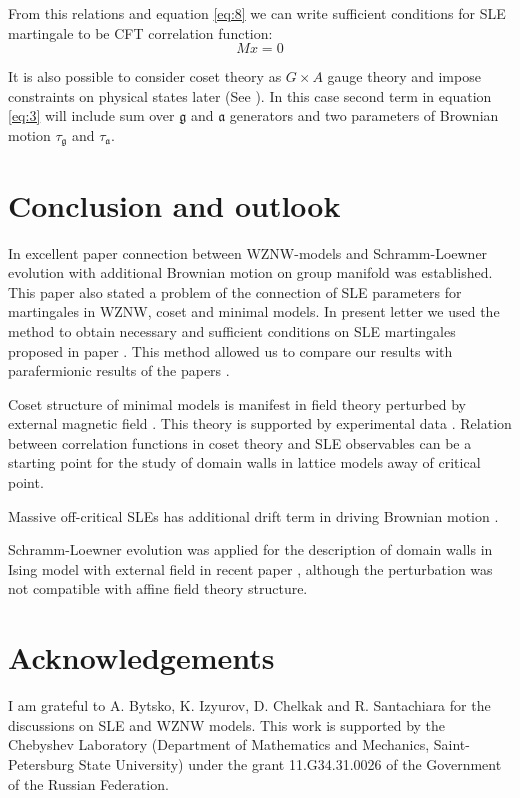 \documentclass{jetpl}
\newcommand{\gf}{\mathfrak{g}}
\newcommand{\af}{\mathfrak{a}}
\begin{document}
From this relations and equation \eqref{eq:8} we can write sufficient conditions for SLE martingale to be CFT correlation function:
\begin{equation}
  \label{eq:23}
  M x = 0
\end{equation}

It is also possible to consider coset theory as $G\times A$  gauge theory and impose constraints on physical states later (See \cite{hwang1993brst,kogan1997knizhnik,gawdzki1988g,figueroa89equivalence}). In this case second term in equation \eqref{eq:3} will include sum over $\gf$ and $\af$ generators and two parameters of Brownian motion $\tau_{\gf}$ and $\tau_{\af}$. 

\section{Conclusion and outlook}
\label{sec:outlook}

In excellent paper \cite{bettelheim2005stochastic} connection between WZNW-models and Schramm-Loewner evolution with additional Brownian motion on group manifold was established. This paper also stated a problem of the connection of SLE parameters for martingales in WZNW, coset and minimal models. In present letter we used the method to obtain necessary and sufficient conditions on SLE martingales proposed in paper \cite{alekseev2010sle}. This method allowed us to compare our results with parafermionic results of the papers \cite{santachiara2008sle,picco2008numerical}.

Coset structure of minimal models is manifest in field theory perturbed by external magnetic field \cite{fateev1990conformal,eguchi1989deformations,hollowood1989rational}. This theory is supported by experimental data \cite{coldea2010quantum}. Relation between correlation functions in coset theory and SLE observables can be a starting point for the study of domain walls in lattice models away of critical point. 

Massive off-critical SLEs has additional drift term in driving Brownian motion \cite{makarov2010off}.

  Schramm-Loewner evolution was applied for the description of domain walls in Ising model with external field in recent paper \cite{stevenson2011domain}, although the perturbation was not compatible with affine field theory structure. 


\section*{Acknowledgements}
\label{sec:acknowledgements}
 I am grateful to A. Bytsko, K. Izyurov, D. Chelkak and R. Santachiara for the discussions on SLE and WZNW models. This work  is supported by
the Chebyshev Laboratory (Department of Mathematics and Mechanics,
Saint-Petersburg State University) under the grant 11.G34.31.0026
of the Government of the Russian Federation.
\end{document}

